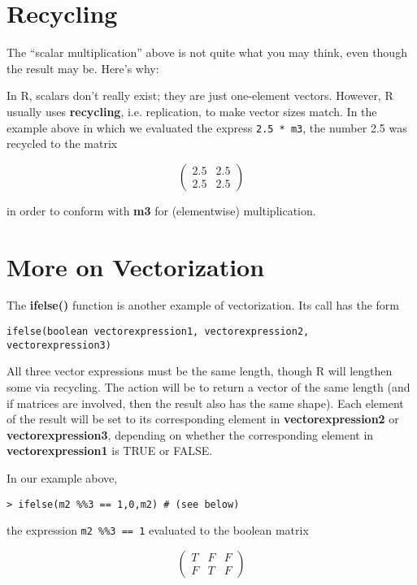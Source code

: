 \section{Recycling}

The ``scalar multiplication'' above is not quite what you may think,
even though the result may be.  Here's why:

In R, scalars don't really exist; they are just one-element vectors.
However, R usually uses {\bf recycling}, i.e. replication, to make
vector sizes match.  In the example above in which we evaluated the
express \verb^2.5 * m3^, the number 2.5 was recycled to the matrix 

\begin{equation}
\left (
\begin{array}{rr}
2.5 & 2.5 \\
2.5 & 2.5 
\end{array}
\right )
\end{equation}

in order to conform with {\bf m3} for (elementwise) multiplication.

\section{More on Vectorization}

The {\bf ifelse()} function is another example of vectorization.  Its
call has the form

\begin{lstlisting}
ifelse(boolean vectorexpression1, vectorexpression2, vectorexpression3)
\end{lstlisting}

All three vector expressions must be the same length, though R will
lengthen some via recycling.  The action will be to return a vector of
the same length (and if matrices are involved, then the result also has
the same shape).  Each element of the result will be set to its
corresponding element in {\bf vectorexpression2} or {\bf
vectorexpression3}, depending on whether the corresponding element in
{\bf vectorexpression1} is TRUE or FALSE.

In our example above,

\begin{lstlisting}
> ifelse(m2 %%3 == 1,0,m2) # (see below)
\end{lstlisting}

the expression \verb^m2 %%3 == 1^ evaluated to the boolean matrix

\begin{equation}
\left (
\begin{array}{rrr}
T & F & F\\
F & T & F
\end{array}
\right )
\end{equation}

